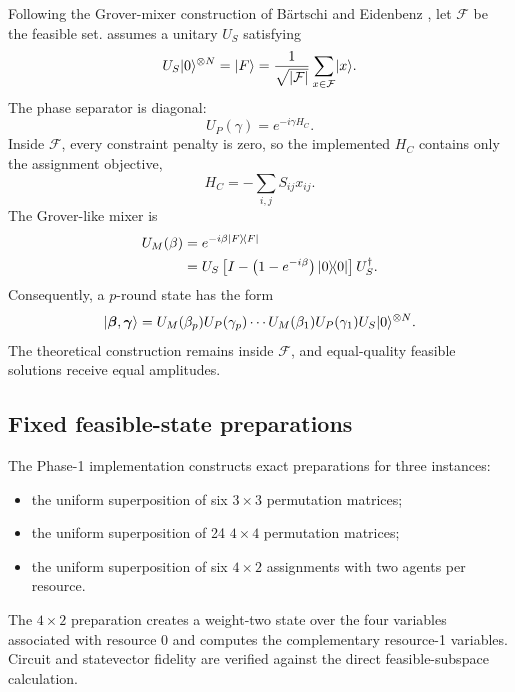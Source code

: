 Following the Grover-mixer construction of Bärtschi and Eidenbenz \cite{baertschi2020}, let $\mathcal F$ be the feasible set. \GMQAOA{} assumes a unitary $U_S$ satisfying
\begin{equation}
U_S\lvert 0\rangle^{\otimes N}=\lvert F\rangle
=\frac{1}{\sqrt{|\mathcal F|}}
\sum_{x\in\mathcal F}\lvert x\rangle.
\label{eq:feasible_superposition}
\end{equation}
The phase separator is diagonal:
\begin{equation}
U_P(\gamma)=e^{-i\gamma H_C}.
\label{eq:gm_phase_separator}
\end{equation}
Inside $\mathcal F$, every constraint penalty is zero, so the implemented $H_C$ contains only the assignment objective,
\begin{equation}
H_C=-\sum_{i,j}S_{ij}x_{ij}.
\end{equation}
The Grover-like mixer is
\begin{align}
U_M(\beta)
&=e^{-i\beta\lvert F\rangle\!\langle F\rvert}\\
&=U_S\left[I-\left(1-e^{-i\beta}\right)
\lvert 0\rangle\!\langle 0\rvert\right]U_S^\dagger.
\label{eq:grover_mixer}
\end{align}
Consequently, a $p$-round state has the form
\begin{equation}
\lvert \bm\beta,\bm\gamma\rangle=
U_M(\beta_p)U_P(\gamma_p)\cdots
U_M(\beta_1)U_P(\gamma_1)U_S\lvert 0\rangle^{\otimes N}.
\end{equation}
The theoretical construction remains inside $\mathcal F$, and equal-quality feasible solutions receive equal amplitudes.

\subsection{Fixed feasible-state preparations}

The Phase-1 implementation constructs exact preparations for three instances:
\begin{itemize}
  \item the uniform superposition of six $3\times3$ permutation matrices;
  \item the uniform superposition of 24 $4\times4$ permutation matrices;
  \item the uniform superposition of six $4\times2$ assignments with two agents per resource.
\end{itemize}
The $4\times2$ preparation creates a weight-two state over the four variables associated with resource 0 and computes the complementary resource-1 variables. Circuit and statevector fidelity are verified against the direct feasible-subspace calculation.

